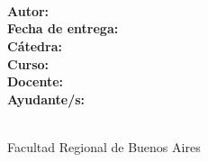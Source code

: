 
\begin{titlepage}

\  \\ [2.4cm]
\huge{\textcolor{UTNRed}{\bfseries{\thetitle}}} \\ [0.4cm]
\Large{\thesubtitle} \\ [2.6cm]

\large{
    \textbf{Autor:} \theauthor \\
    \textbf{Fecha de entrega:} \duedate \\
    \textbf{Cátedra:} \course \\
    \textbf{Curso:} \coursenumber\\
    \textbf{Docente:} \instructor \\
    \textbf{Ayudante/s:} \auxiliar \\[2.2cm]
}

\vfill

\begin{flushright}
\large {
    \university \\
    Facultad Regional de Buenos Aires\\
    \department \\
}
\end{flushright}

\end{titlepage}

